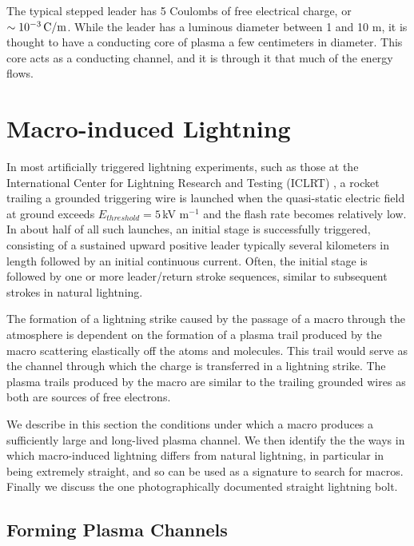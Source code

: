 \documentclass[%
 reprint,
 amsmath,amssymb,
 aps,
]{revtex4-2}
\begin{document}
    The typical stepped leader has 5 Coulombs of free electrical charge, or $\sim10^{-3} \, \rm{C/m}$. While the leader has a luminous diameter between 1 and 10 m, it is thought to have a conducting core of plasma a few centimeters in diameter. This core acts as a conducting channel, and it is through it that much of the energy flows.



\section{Macro-induced \textbf{}Lightning} %
\label{sec:macro_induced_lightning}

    In most artificially triggered lightning experiments, such as those at the International Center for Lightning Research and Testing (ICLRT) \cite{Hill2012, Hill2013}, a rocket trailing a grounded triggering wire is launched when the quasi-static electric field at ground exceeds $E_{threshold} = 5\,$kV m$^{-1}$ and the flash rate becomes relatively low. In about half of all such launches, an initial stage is successfully triggered, consisting of a sustained upward positive leader typically several kilometers in length followed by an initial continuous current. Often, the initial stage is followed by one or more leader/return stroke sequences, similar to subsequent strokes in natural lightning. 

    The formation of a lightning strike caused by the passage of a macro through the atmosphere is dependent on the formation of a plasma trail produced by the macro scattering elastically off the atoms and molecules. This trail would serve as the channel through which the charge is transferred in a lightning strike. The plasma trails produced by the macro are similar to the trailing grounded wires as both are sources of free electrons.  

    We describe in this section the conditions under which a macro produces a sufficiently large and long-lived plasma channel.  We then identify the the ways in which macro-induced lightning differs from natural lightning, in particular in being extremely straight, and so can be used as a signature to search for macros.  Finally we discuss the one photographically documented straight lightning bolt.

    \subsection{Forming Plasma Channels} %
    \label{sub:macro_induced_plasma_channels}
\end{document}

